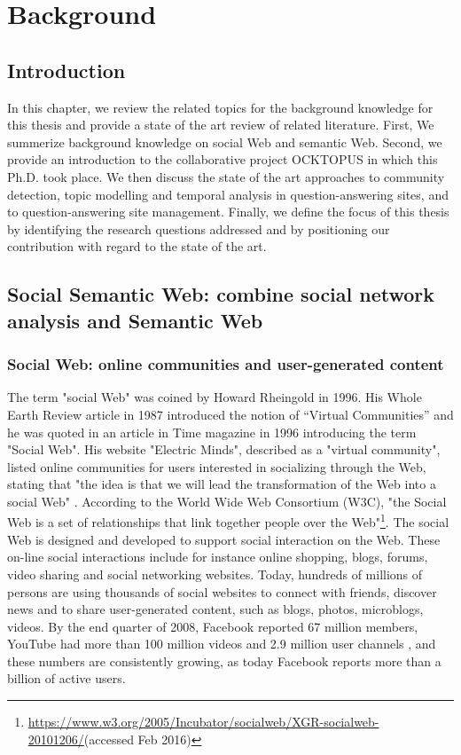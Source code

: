 \chapter{Background}
\doublespacing
\label{chap:background}
\minitoc


\section{Introduction}
In this chapter, we review the related topics for the background knowledge for this thesis and provide a state of the art review of related literature. First, We summerize background knowledge on social Web and semantic Web.
Second, we provide an introduction to the collaborative project OCKTOPUS in which this Ph.D. took place.
We then discuss the state of the art approaches to community detection, topic modelling and temporal analysis in question-answering sites, and to question-answering site management. 
Finally, we define the focus of this thesis by identifying the research questions addressed and by  positioning our contribution with regard to the state of the art.

\section{Social Semantic Web: combine social network analysis and Semantic Web}

\subsection{Social Web: online communities and user-generated content}
The term "social Web" was coined by Howard Rheingold in 1996. His Whole Earth Review article in 1987 introduced the notion of “Virtual Communities” and he was quoted in an article in Time magazine in 1996 introducing the term "Social Web". His website "Electric Minds", described as a "virtual community", listed online communities for users interested in socializing through the Web, stating that "the idea is that we will lead the transformation of the Web into a social Web" \cite{rheingold2000virtual}. According to the World Wide Web Consortium (W3C), "the Social Web is a set of relationships that link together people over the Web"\footnote{\url{https://www.w3.org/2005/Incubator/socialweb/XGR-socialweb-20101206/}(accessed Feb 2016)}. The social Web is designed and developed to support social interaction  \cite{porter2010designing} on the Web. These on-line social interactions include for instance online shopping, blogs, forums, video sharing and social networking websites. Today, hundreds of millions of persons are using thousands of social websites to connect with friends, discover news and to share user-generated content, such as blogs, photos, microblogs, videos. By the end quarter of 2008, Facebook reported 67 million members, YouTube had more than 100 million videos and 2.9 million user channels  \cite{watson2008causewired}, and these numbers are consistently growing, as today Facebook reports more than a billion of active users.  


